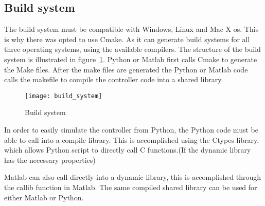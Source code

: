 \subsection{Build system}
The build system must be compatible with Windows, Linux and Mac X os. This is why there was opted to use Cmake. As it can generate build systems for all three operating systems, using the available compilers. The structure of the build system is illustrated in figure~\ref{fig:build system}. Python or Matlab first calls Cmake to generate the Make files. After the make files are generated the Python or Matlab code calls the makefile to compile the controller code into a shared library.
\begin{figure}[H]
	\centering
	\texttt{[image: build\_system]}
	\caption{Build system}
	\label{fig:build system}
\end{figure}
In order to easily simulate the controller from Python, the Python code must be able to call into a compile library. This is accomplished using the Ctypes library, which allows Python script to directly call C functions.(If the dynamic library has the necessary properties)

Matlab can also call directly into a dynamic library, this is accomplished through the callib function in Matlab. The same compiled shared library can be used for either Matlab or Python.

